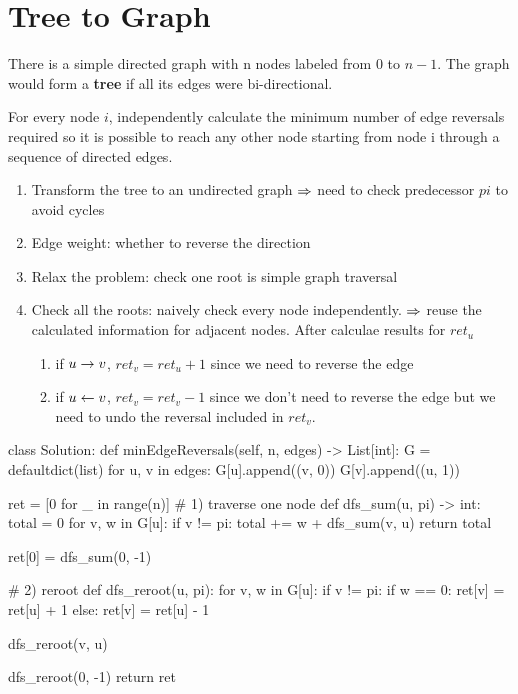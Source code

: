 \section{Tree to Graph}
 There is a simple directed graph with n nodes labeled from $0$ to $n - 1$. The graph would form a \textbf{tree} if all its edges were bi-directional. 

For every node $i$, independently calculate the minimum number of edge reversals required so it is possible to reach any other node starting from node i through a sequence of directed edges.

\begin{enumerate}
\item Transform the tree to an undirected graph $\Rightarrow$ need to check predecessor $pi$ to avoid cycles
\item Edge weight: whether to reverse the direction
\item Relax the problem: check one root is simple graph traversal
\item Check all the roots: naively check every node independently. $\Rightarrow$ reuse the calculated information for adjacent nodes. After calculae results for $ret_u$
\begin{enumerate}
\item if $u \rightarrow v$, $ret_v = ret_u + 1$ since we need to reverse the edge 
\item if $u \leftarrow v$, $ret_v = ret_v - 1$ since we don't need to reverse the edge but we need to undo the reversal included in $ret_v$.
\end{enumerate}
\end{enumerate}
\begin{python}
class Solution:
  def minEdgeReversals(self, n, edges) -> List[int]:
    G = defaultdict(list)
    for u, v in edges:
      G[u].append((v, 0))
      G[v].append((u, 1))

    ret = [0 for _ in range(n)]
    # 1) traverse one node
    def dfs_sum(u, pi) -> int:
      total = 0
      for v, w in G[u]:
        if v != pi: 
          total += w + dfs_sum(v, u)
      return total

    ret[0] = dfs_sum(0, -1)

    # 2) reroot
    def dfs_reroot(u, pi):
      for v, w in G[u]:
        if v != pi:
          if w == 0:
            ret[v] = ret[u] + 1
          else:
            ret[v] = ret[u] - 1

          dfs_reroot(v, u)

    dfs_reroot(0, -1)
    return ret
\end{python}

